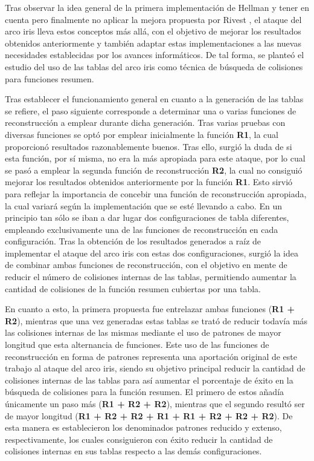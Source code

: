 \documentclass[12pt,spanish,listoffigures,listoftables,listofalgorithms]{tfgetsinf}
\begin{document}
Tras observar la idea general de la primera implementación de Hellman \cite{hellman} y tener en cuenta pero finalmente no aplicar la mejora propuesta por Rivest \cite{rivest}, el ataque del arco iris lleva estos conceptos más allá, con el objetivo de mejorar los resultados obtenidos anteriormente y también adaptar estas implementaciones a las nuevas necesidades establecidas por los avances informáticos. De tal forma, se planteó el estudio del uso de las tablas del arco iris como técnica de búsqueda de colisiones para funciones resumen.

Tras establecer el funcionamiento general en cuanto a la generación de las tablas se refiere, el paso siguiente corresponde a determinar una o varias funciones de reconstrucción a emplear durante dicha generación. Tras varias pruebas con diversas funciones se optó por emplear inicialmente la función \textbf{R1}, la cual proporcionó resultados razonablemente buenos. Tras ello, surgió la duda de si esta función, por sí misma, no era la más apropiada para este ataque, por lo cual se pasó a emplear la segunda función de reconstrucción \textbf{R2}, la cual no consiguió mejorar los resultados obtenidos anteriormente por la función \textbf{R1}. Esto sirvió para reflejar la importancia de concebir una función de reconstrucción apropiada, la cual variará según la implementación que se esté llevando a cabo. En un principio tan sólo se iban a dar lugar dos configuraciones de tabla diferentes, empleando exclusivamente una de las funciones de reconstrucción en cada configuración. Tras la obtención de los resultados generados a raíz de implementar el ataque del arco iris con estas dos configuraciones, surgió la idea de combinar ambas funciones de reconstrucción, con el objetivo en mente de reducir el número de colisiones internas de las tablas, permitiendo aumentar la cantidad de colisiones de la función resumen cubiertas por una tabla.

En cuanto a esto, la primera propuesta fue entrelazar ambas funciones (\textbf{R1 + R2}), mientras que una vez generadas estas tablas se trató de reducir todavía más las colisiones internas de las mismas mediante el uso de patrones de mayor longitud que esta alternancia de funciones. Este uso de las funciones de reconstrucción en forma de patrones representa una aportación original de este trabajo al ataque del arco iris, siendo su objetivo principal reducir la cantidad de colisiones internas de las tablas para así aumentar el porcentaje de éxito en la búsqueda de colisiones para la función resumen. El primero de estos añadía únicamente un paso más (\textbf{R1 + R2 + R2}), mientras que el segundo resultó ser de mayor longitud (\textbf{R1 + R2 + R2 + R1 + R1 + R2 + R2 + R2}). De esta manera es establecieron los denominados patrones reducido y extenso, respectivamente, los cuales consiguieron con éxito reducir la cantidad de colisiones internas en sus tablas respecto a las demás configuraciones.
\end{document}
